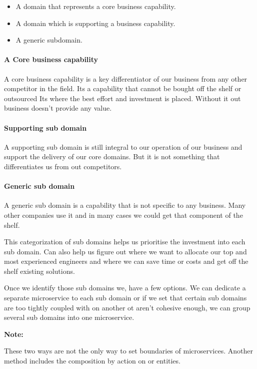 \documentclass[a4paper, 11pt]{book}
\newenvironment{note}{
    \begin{siderule}
        \textbf{Note: }
        }{
    \end{siderule}}
\begin{document}
    \begin{itemize}
        \item A domain that represents a core business capability.
        \item A domain which is supporting a business capability.
        \item A generic subdomain.
    \end{itemize}

    \paragraph{A Core business capability}
    A core business capability is a key differentiator of our business from any other competitor in the field.
    Its a capability that cannot be bought off the shelf or outsourced
    Its where the best effort and investment is placed.
    Without it out business doesn't provide any value.

    \paragraph{Supporting sub domain}
    A supporting sub domain is still integral to our operation of our business and support the delivery of our core domains.
    But it is not something that differentiates us from out competitors.

    \paragraph{Generic sub domain}
    A generic sub domain is a capability that is not specific to any business.
    Many other companies use it and in many cases we could get that component of the shelf.

    This categorization of sub domains helps us prioritise the investment into each sub domain.
    Can also help us figure out where we want to allocate our top and most experienced engineers and where we can save time or costs and get off the shelf existing solutions.

    Once we identify those sub domains we, have a few options.
    We can dedicate a separate microservice to each sub domain or if we set that certain sub domains are too tightly coupled with on another ot aren't cohesive enough, we can group several sub domains into one microservice.

    \begin{note}
        These two ways are not the only way to set boundaries of microservices.
        Another method includes the composition by action on or entities.
    \end{note}
\end{document}
